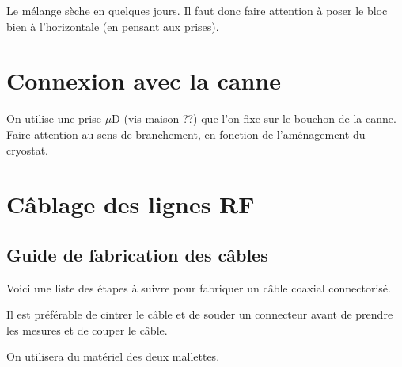 \documentclass[a4paper,11pt]{article}
\newcommand{\uD}{$\mu$D }
\begin{document}
Le mélange sèche en quelques jours. Il faut donc faire attention à poser le bloc bien à l'horizontale (en pensant aux prises).

\section{Connexion avec la canne}
On utilise une prise \uD (vis maison ??) que l'on fixe sur le bouchon de la canne. Faire attention au sens de branchement, en fonction de l'aménagement du cryostat.


\section{Câblage des lignes RF}
\subsection{Guide de fabrication des câbles}
Voici une liste des étapes à suivre pour fabriquer un câble coaxial connectorisé.

Il est préférable de cintrer le câble et de souder un connecteur avant de prendre les mesures et de couper le câble.

On utilisera du matériel des deux mallettes.
\end{document}
